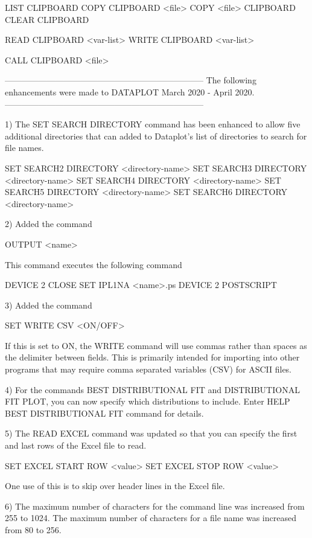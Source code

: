          LIST CLIPBOARD
         COPY CLIPBOARD <file>
         COPY <file> CLIPBOARD
         CLEAR CLIPBOARD

         READ CLIPBOARD  <var-list>
         WRITE CLIPBOARD <var-list>

         CALL CLIPBOARD  <file>

-----------------------------------------------------------------------
The following enhancements were made to DATAPLOT
March 2020 - April 2020.
-----------------------------------------------------------------------

 1) The SET SEARCH DIRECTORY command has been enhanced to allow five
    additional directories that can added to Dataplot's list of directories
    to search for file names.

       SET SEARCH2 DIRECTORY <directory-name>
       SET SEARCH3 DIRECTORY <directory-name>
       SET SEARCH4 DIRECTORY <directory-name>
       SET SEARCH5 DIRECTORY <directory-name>
       SET SEARCH6 DIRECTORY <directory-name>

 2) Added the command

       OUTPUT  <name>

    This command executes the following command

       DEVICE 2 CLOSE
       SET IPL1NA <name>.ps
       DEVICE 2 POSTSCRIPT

 3) Added the command

       SET WRITE CSV  <ON/OFF>

    If this is set to ON, the WRITE command will use commas rather
    than spaces as the delimiter between fields.  This is primarily
    intended for importing into other programs that may require
    comma separated variables (CSV) for ASCII files.

 4) For the commands BEST DISTRIBUTIONAL FIT and DISTRIBUTIONAL FIT PLOT,
    you can now specify which distributions to include.  Enter
    HELP BEST DISTRIBUTIONAL FIT command for details.

 5) The READ EXCEL command was updated so that you can specify the
    first and last rows of the Excel file to read.

        SET EXCEL START ROW <value>
        SET EXCEL STOP  ROW <value>

    One use of this is to skip over header lines in the Excel file.

 6) The maximum number of characters for the command line was
    increased from 255 to 1024.  The maximum number of characters
    for a file name was increased from 80 to 256.


